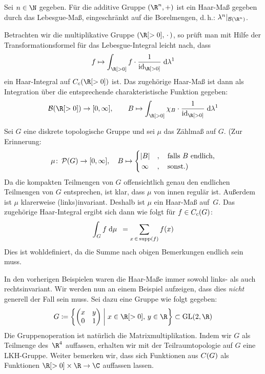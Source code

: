 \medskip
\begin{BspList}[\label{tg:haarbsp}]
\item
    Sei $n\in\N$ gegeben.
    Für die additive Gruppe $(\R^n,+)$ ist ein Haar-Maß gegeben durch das
    Lebesgue-Maß, eingeschränkt auf die Borelmengen, d.\,h.:
    $\lambda^n\vert_{\borelsigmaalg(\R^n)}$.
    
\item\label{tg:haarbsp:positivereals}
    Betrachten wir die multiplikative Gruppe $(\R[>0], \,\cdot\,)$, so prüft man mit
    Hilfe der Transformationsformel für das Lebesgue-Integral leicht nach, dass
    \[ f \mapsto \int_{\R[>0]} f \cdot \frac{1}{\id_{\R[>0]}} \dif{\lambda^1} \]
    ein Haar-Integral auf $\contcomp(\R[>0])$ ist. Das zugehörige Haar-Maß
    ist dann als Integration über die entsprechende charakteristische Funktion
    gegeben:
    \[ \borelsigmaalg(\R[>0])\to[0,\infty],\qquad
        B \mapsto \int_{\R[>0]} \chi_B \cdot \frac{1}{\id_{\R[>0]}} \dif{\lambda^1}
    \]
    
\item
    Sei $G$ eine diskrete topologische Gruppe und sei $\mu$ das Zählmaß auf $G$.
    (Zur Erinnerung:
    \[ \mu\colon\operatorname{\mathcal{P}}(G)\to[0,\infty], \quad B\mapsto \begin{cases}
            \lvert B\rvert &,\quad \text{falls $B$ endlich,}   \\
            \,\infty  &,\quad \text{sonst.)}
        \end{cases}
    \]
    Da die kompakten Teilmengen von $G$ offensichtlich genau den endlichen
    Teilmengen von $G$ entsprechen, ist klar, dass $\mu$ von innen regulär ist.
    Außerdem ist $\mu$ klarerweise (links)invariant.
    Deshalb ist $\mu$ ein Haar-Maß auf~$G$. Das zugehörige Haar-Integral ergibt
    sich dann wie folgt für $f\in C_c(G)$:
    \[ \int_G f \;\mathrm{d} \mu \mkern9mu = \sum_{x\,\in\,\operatorname{supp}(f)} f(x) \]
    Dies ist wohldefiniert, da die Summe nach obigen Bemerkungen endlich
    sein muss.
    
\item\label{tg:haarbsp:matgroup}
    In den vorherigen Beispielen waren die Haar-Maße immer sowohl links- als auch
    rechts\-in\-va\-ri\-ant. Wir werden nun an einem Beispiel aufzeigen, dass dies
    \emph{nicht} generell der Fall sein muss. Sei dazu eine Gruppe wie folgt
    gegeben:
    \[ G \defeq \left\{ \Matrix{x & y \\ 0 & 1} 
                \Mid[\;] x\in\R[>0],\,y\in\R \right\}
        \subset \matGL(2,\R)
    \]
    Die Gruppenoperation ist natürlich die Matrixmultiplikation. Indem wir
    $G$ als Teilmenge des~$\R^4$ auffassen, erhalten wir mit der
    Teilraumtopologie auf $G$ eine LKH-Gruppe. Weiter bemerken wir, dass sich
    Funktionen aus $C(G)$ als Funktionen $\R[>0]\times\R\to\C$
    auffassen lassen.
    

\end{BspList}
